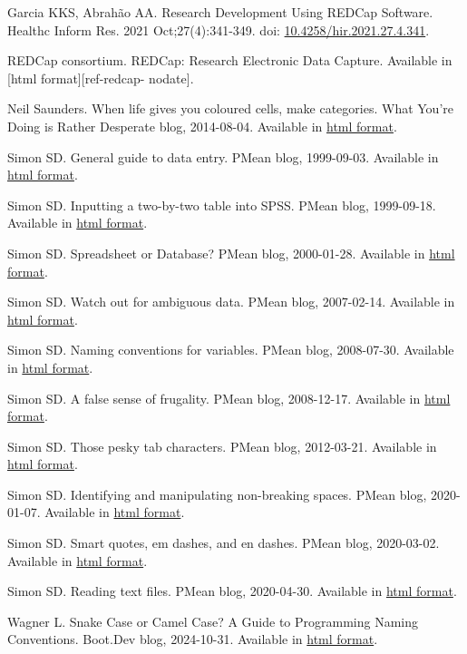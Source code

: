 \documentclass[
  letterpaper,
  DIV=11,
  numbers=noendperiod]{scrreprt}
\begin{document}
Garcia KKS, Abrahão AA. Research Development Using REDCap Software.
Healthc Inform Res. 2021 Oct;27(4):341-349. doi:
\href{https://doi.org/10.4258/hir.2021.27.4.341}{10.4258/hir.2021.27.4.341}.

REDCap consortium. REDCap: Research Electronic Data Capture. Available
in {[}html format{]}{[}ref-redcap- nodate{]}.

Neil Saunders. When life gives you coloured cells, make categories. What
You're Doing is Rather Desperate blog, 2014-08-04. Available in
\href{https://nsaunders.wordpress.com/2014/08/06/when-life-gives-you-coloured-cells-make-categories/}{html
format}.

Simon SD. General guide to data entry. PMean blog, 1999-09-03. Available
in \href{http://pmean.com/posts/steps-in-data-entry/}{html format}.

Simon SD. Inputting a two-by-two table into SPSS. PMean blog,
1999-09-18. Available in
\href{http://pmean.com/posts/two-by-two-table-in-spss/}{html format}.

Simon SD. Spreadsheet or Database? PMean blog, 2000-01-28. Available in
\href{http://pmean.com/posts/spreadsheet-or-database/}{html format}.

Simon SD. Watch out for ambiguous data. PMean blog, 2007-02-14.
Available in \href{http://pmean.com/posts/ambiguous-data/}{html format}.

Simon SD. Naming conventions for variables. PMean blog, 2008-07-30.
Available in \href{http://www.pmean.com/08/NamingConventions.html}{html
format}.

Simon SD. A false sense of frugality. PMean blog, 2008-12-17. Available
in \href{http://www.pmean.com/08/FalseFrugality.html}{html format}.

Simon SD. Those pesky tab characters. PMean blog, 2012-03-21. Available
in \href{http://pmean.com/posts/pesky-tabs/}{html format}.

Simon SD. Identifying and manipulating non-breaking spaces. PMean blog,
2020-01-07. Available in
\href{http://pmean.com/posts/smart-quotes/}{html format}.

Simon SD. Smart quotes, em dashes, and en dashes. PMean blog,
2020-03-02. Available in
\href{http://pmean.com/posts/non-breaking-spaces/}{html format}.

Simon SD. Reading text files. PMean blog, 2020-04-30. Available in
\href{http://pmean.com/posts/reading-text-files/}{html format}.

Wagner L. Snake Case or Camel Case? A Guide to Programming Naming
Conventions. Boot.Dev blog, 2024-10-31. Available in
\href{https://blog.boot.dev/clean-code/casings-in-coding/}{html format}.
\end{document}
